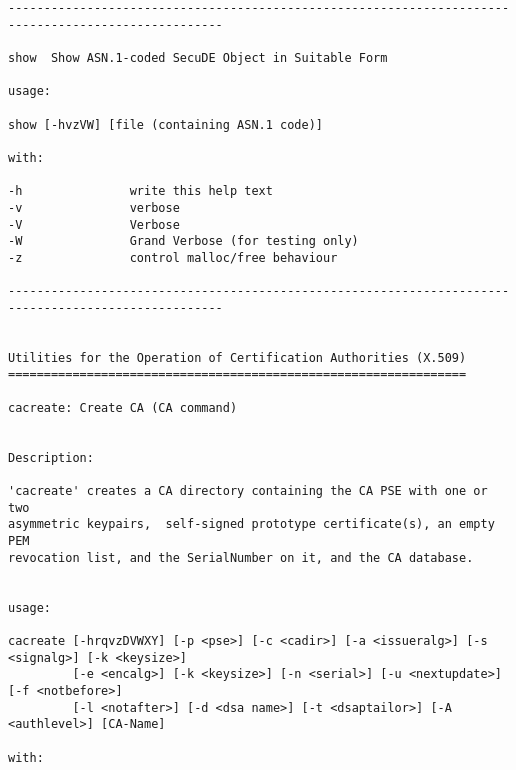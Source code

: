 {\begin{verbatim}
----------------------------------------------------------------------------------------------------

show  Show ASN.1-coded SecuDE Object in Suitable Form

usage:

show [-hvzVW] [file (containing ASN.1 code)]

with:

-h               write this help text
-v               verbose
-V               Verbose
-W               Grand Verbose (for testing only)
-z               control malloc/free behaviour

----------------------------------------------------------------------------------------------------


Utilities for the Operation of Certification Authorities (X.509)
================================================================

cacreate: Create CA (CA command)


Description:

'cacreate' creates a CA directory containing the CA PSE with one or two
asymmetric keypairs,  self-signed prototype certificate(s), an empty PEM
revocation list, and the SerialNumber on it, and the CA database.


usage:

cacreate [-hrqvzDVWXY] [-p <pse>] [-c <cadir>] [-a <issueralg>] [-s <signalg>] [-k <keysize>]
         [-e <encalg>] [-k <keysize>] [-n <serial>] [-u <nextupdate>] [-f <notbefore>] 
         [-l <notafter>] [-d <dsa name>] [-t <dsaptailor>] [-A <authlevel>] [CA-Name]

with:


\end{verbatim}}
